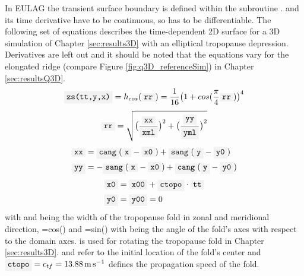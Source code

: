 In EULAG the transient surface boundary  is defined within the subroutine .  and its time derivative  have to be continuous, so  has to be differentiable. The following set of equations describes the time-dependent 2D surface  for a 3D simulation of Chapter \ref{sec:results3D} with an elliptical tropopause depression. Derivatives are left out and it should be noted that the equations vary for the elongated ridge (compare Figure \ref{fig:q3D_referenceSim}) in Chapter \ref{sec:resultsQ3D}.
\begin{equation}
    \code{zs(tt,y,x)} = h_{cos}(\code{rr}) =\frac{1}{16} \bigl(1+cos(\frac{\pi}{4} \code{rr})\bigr)^4
    \label{equ:cosMtn-1}
\end{equation}
\begin{equation}
    \code{rr} = \sqrt{\bigl(\frac{\code{xx}}{\code{xml}}\bigr)^2 + \bigl(\frac{\code{yy}}{\code{yml}}\bigr)^2}
    \label{equ:cosMtn-2}
\end{equation}
\begin{equation}
    \begin{aligned}
        \code{xx} &= \code{cang}(\code{x}-\code{x0}) + \code{sang}(\code{y}-\code{y0}) \\
        \code{yy} &=-\code{sang}(\code{x}-\code{x0}) + \code{cang}(\code{y}-\code{y0}) 
    \end{aligned}
    \label{equ:cosMtn-3}
\end{equation}
\begin{equation}
    \begin{aligned}
    \code{x0} &= \code{x00} + \code{ctopo} \cdot \code{tt} \\ 
    \code{y0} &= \code{y00} = 0
    \label{equ:cosMtn-4}
    \end{aligned}
\end{equation}
with  and  being the width of the tropopause fold in zonal and meridional direction, =cos() and =sin() with  being the angle of the fold's axes with respect to the domain axes.  is used for rotating the tropopause fold in Chapter \ref{sec:results3D}.  and  refer to the initial location of the fold's center and $\code{ctopo}=c_{tf}=\SI{13.88}{\meter \per \second}$ defines the propagation speed of the fold.

